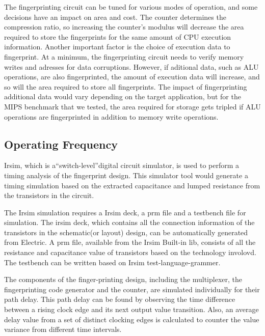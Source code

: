\documentclass[10pt,journal,compsoc]{IEEEtran}
\begin{document}
The fingerprinting circuit can be tuned for various modes of operation, and some decisions have an impact on area and cost. The counter determines the compression ratio, so increasing the counter's modulus will decrease the area required to store the fingerprints for the same amount of CPU execution information. Another important factor is the choice of execution data to fingerprint. At a minimum, the fingerprinting circuit needs to verify memory writes and adresses for data corruptions. However, if aditional data, such as ALU operations, are also fingerprinted, the amount of execution data will increase, and so will the area required to store all fingerprints. The impact of fingerprinting additional data would vary depending on the target application, but for the MIPS benchmark that we tested, the area required for storage gets tripled if ALU operations are fingerprinted in addition to memory write operations. 

\subsection{Operating Frequency}
Irsim, which is a“switch-level”digital circuit simulator, is used to perform a timing analysis of the fingerprint design. This simulator tool would generate a timing simulation based on the extracted capacitance and lumped resistance from the transistors in the circuit.
    
    The Irsim simulation requires a Irsim deck, a prm file and a testbench file for simulation. The irsim deck, which contains all the connection information of the transistors in the schematic(or layout) design, can be automatically generated from Electric. A prm file, available from the Irsim Built-in lib, consists of all the resistance and capacitance value of transistors based on the technology involovd. The testbench can be written based on Irsim test-language-grammer.
    
    The components of the finger-printing design, including the multiplexer, the fingerprinting code generator and the counter, are simulated individually for their path delay. This path delay can be found by observing the time difference between a rising clock edge and its next output value transition. Also, an average delay value from a set of distinct clocking edges is calculated to counter the value variance from different time intervals.
    
\end{document}
